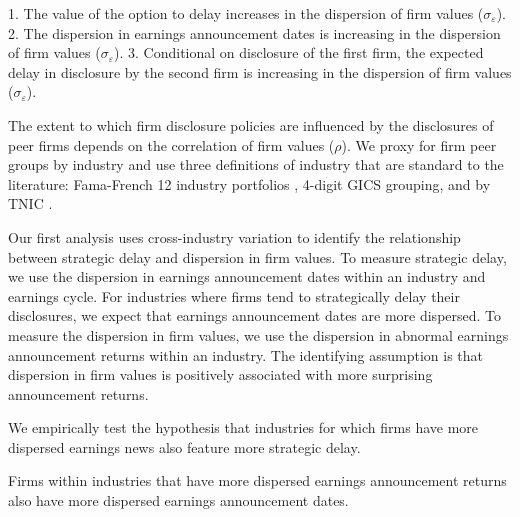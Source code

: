 \documentclass[authoryear,letterpaper,english,12pt]{elsarticle}
\begin{document}
1. The value of the option to delay increases in the dispersion of firm values ($\sigma_\varepsilon$). 
2. The dispersion in earnings announcement dates is increasing in the dispersion of firm values ($\sigma_\varepsilon$).  
3. Conditional on disclosure of the first firm, the expected delay in disclosure by the second firm is increasing in the dispersion of firm values ($\sigma_\varepsilon$).

The extent to which firm disclosure policies are influenced by the disclosures of peer firms depends on the correlation of firm values ($\rho$). We proxy for firm peer groups by industry and use three definitions of industry that are standard to the literature: Fama-French 12 industry portfolios \citep{fama1997industry}, 4-digit GICS grouping, and by TNIC \citep{hoberg2010product,hoberg2016text}.

Our first analysis uses cross-industry variation to identify the relationship between strategic delay and dispersion in firm values. To measure strategic delay, we use the dispersion in earnings announcement dates within an industry and earnings cycle. For industries where firms tend to strategically delay their disclosures, we expect that earnings announcement dates are more dispersed. To measure the dispersion in firm values, we use the dispersion in abnormal earnings announcement returns within an industry. The identifying assumption is that dispersion in firm values is positively associated with more surprising announcement returns. 

We empirically test the hypothesis that industries for which firms have more dispersed earnings news also feature more strategic delay. 
\begin{hypothesis}\label{hyp:crossindustry}
Firms within industries that have more dispersed earnings announcement returns also have more dispersed earnings announcement dates. 
\end{hypothesis}
\end{document}
